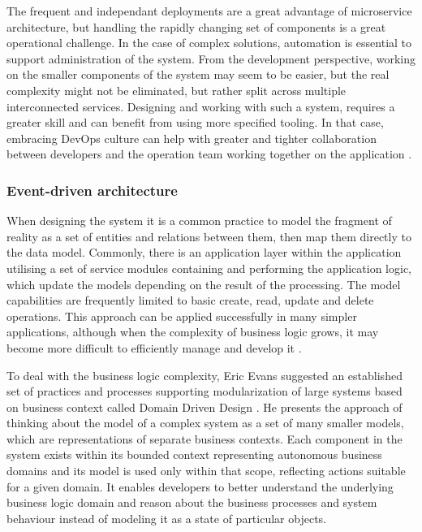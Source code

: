 The frequent and independant deployments are a great advantage of microservice architecture, but handling the rapidly changing set of components is a great operational challenge. In the case of complex solutions, automation is essential to support administration of the system. From the development perspective, working on the smaller components of the system may seem to be easier, but the real complexity might not be eliminated, but rather split across multiple interconnected services. Designing and working with such a system, requires a greater skill and can benefit from using more specified tooling. In that case, embracing DevOps culture can help with greater and tighter collaboration between developers and the operation team working together on the application \cite{FowlerMicroservicesTradeoffs}.

\subsubsection{Event-driven architecture}

When designing the system it is a common practice to model the fragment of reality as a set of entities and relations between them, then map them directly to the data model. Commonly, there is an application layer within the application utilising a set of service modules containing and performing the application logic, which update the models depending on the result of the processing. The model capabilities are frequently limited to basic create, read, update and delete operations. This approach can be applied successfully in many simpler applications, although when the complexity of business logic grows, it may become more difficult to efficiently manage and develop it \cite{FowlerAnemicModel}.

To deal with the business logic complexity, Eric Evans suggested an established set of practices and processes supporting modularization of large systems based on business context called Domain Driven Design \cite{EvansDDD}. He presents the approach of thinking about the model of a complex system as a set of many smaller models, which are representations of separate business contexts. Each component in the system exists within its bounded context representing autonomous business domains and its model is used only within that scope, reflecting actions suitable for a given domain. It enables developers to better understand the underlying business logic domain and reason about the business processes and system behaviour instead of modeling it as a state of particular objects.

